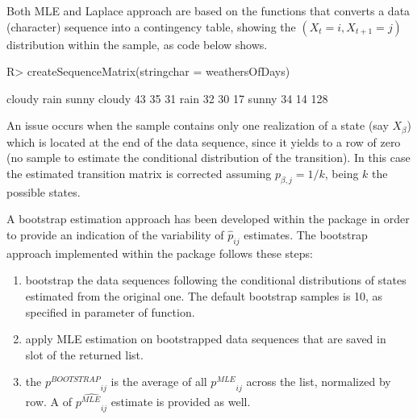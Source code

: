 \documentclass[nojss]{jss}
\begin{document}
Both MLE and Laplace approach are based on the 
functions that converts a data (character) sequence into a contingency table,
showing the $\left( X_{t}=i, X_{t+1}=j\right)$ distribution within the sample,
as code below shows. 

\begin{Schunk}
\begin{Sinput}
R> createSequenceMatrix(stringchar = weathersOfDays)
\end{Sinput}
\begin{Soutput}
       cloudy rain sunny
cloudy     43   35    31
rain       32   30    17
sunny      34   14   128
\end{Soutput}
\end{Schunk}


An issue occurs when the sample contains only one realization of a state (say $X_{\beta}$) which is located at the end of the data sequence, since it yields to a row of zero (no sample to estimate the conditional
distribution of the transition). In this case the estimated transition matrix is
corrected assuming $p_{\beta,j}=1/k$, being $k$ the possible states.

A bootstrap estimation approach has been developed within the package in order
to provide an indication of the variability of ${\hat p}_{ij}$ estimates. The
bootstrap approach implemented within the  package follows
these steps:

\begin{enumerate}
  \item bootstrap the data sequences following the conditional
  distributions of states estimated from the original one. The default bootstrap
  samples is 10, as specified in  parameter of 
  function.
  \item apply MLE estimation on bootstrapped data sequences that are saved in
\\   slot of the returned list.
  \item the ${p^{BOOTSTRAP}}_{ij}$ is the average of all ${p^{MLE}}_{ij}$ across
  the  list, normalized by row. A 
 of $\hat{{p^{MLE}}_{ij}}$ estimate is provided as well.
\end{enumerate}
\end{document}
